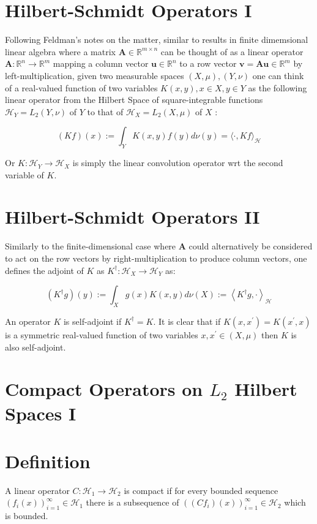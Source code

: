 \documentclass[11pt]{article}
\theoremstyle{plain} %
\theoremstyle{remark}
\begin{document}
\section*{Hilbert-Schmidt Operators I}
Following Feldman's notes on the matter, similar to results in finite
dimemsional linear algebra where a matrix $\mathbf{A} \in \mathbb{R}^{m \times
n}$ can be thought of as a linear operator $\mathbf{A}: \mathbb{R}^{n}
\rightarrow \mathbb{R}^{m}$ mapping a column vector $\mathbf{u} \in
\mathbb{R}^{n}$ to a row vector $\mathbf{v}=\mathbf{A} \mathbf{u} \in
\mathbb{R}^{m}$ by left-multiplication, given two measurable spaces $(X,
\mu),(Y, \nu)$ one can think of a real-valued function of two variables $K(x,
y), x \in X, y \in Y$ as the following linear operator from the Hilbert Space of
square-integrable functions $\mathcal{H}_{Y}=L_{2}(Y, \nu)$ of $Y$ to that of
$\mathcal{H}_{X}=L_{2}(X, \mu)$ of $X$ :

$$
(K f)(x):=\int_{Y} K(x, y) f(y) d \nu(y)=\langle\cdot, K f\rangle_{\mathcal{H}}
$$

Or $K: \mathcal{H}_{Y} \rightarrow \mathcal{H}_{X}$ is simply the linear
convolution operator wrt the second variable of $K$.

\section*{Hilbert-Schmidt Operators II}
Similarly to the finite-dimensional case where $\mathbf{A}$ could alternatively
be considered to act on the row vectors by right-multiplication to produce
column vectors, one defines the adjoint of $K$ as $K^{\dagger}: \mathcal{H}_{X}
\rightarrow \mathcal{H}_{Y}$ as:

$$
\left(K^{\dagger} g\right)(y):=\int_{X} g(x) K(x, y) d \nu(X):=\left\langle K^{\dagger} g, \cdot\right\rangle_{\mathcal{H}}
$$

An operator $K$ is self-adjoint if $K^{\dagger}=K$. It is clear that if
$K\left(x, x^{\prime}\right)=K\left(x^{\prime}, x\right)$ is a symmetric
real-valued function of two variables $x, x^{\prime} \in(X, \mu)$ then $K$ is
also self-adjoint.

\section*{Compact Operators on $L_{2}$ Hilbert Spaces I}
\section*{Definition}
A linear operator $C: \mathcal{H}_{1} \rightarrow \mathcal{H}_{2}$ is compact if
for every bounded sequence $\left(f_{i}(x)\right)_{i=1}^{\infty} \in
\mathcal{H}_{1}$ there is a subsequence of $\left(\left(C
f_{i}\right)(x)\right)_{i=1}^{\infty} \in \mathcal{H}_{2}$ which is bounded.
\end{document}

